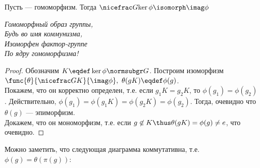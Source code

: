 \begin{theorem}\label{th:mainhom}
  Пусть  --- гомоморфизм. Тогда $\factorgr{G}{\ker\phi}\isomorph \imag\phi$
  \begin{samepage}
    \begin{flushright}
      {\small\itshape%
        Гомоморфный образ группы,\nopagebreak\\%
        Будь во имя коммунизма,\nopagebreak\\%
        Изоморфен фактор-группе\nopagebreak\\%
        По ядру гомоморфизма!}
    \end{flushright}
  \end{samepage}
\end{theorem}
\begin{proof}
  Обозначим $K\eqdef\ker\phi\normsubgr G$. Построим изоморфизм $\func{\theta}{\factorgr{G}{K}}{\imag\phi},\ \theta(gK)\eqdef\phi(g)$.\\
  Покажем, что он корректно определен, т.\:е. если $g_1K=g_2K$, то $\phi(g_1)=\phi(g_2)$. Действительно, $\phi(g_1)=\phi(g_1K)=\phi(g_2K)=\phi(g_2)$. Тогда, очевидно что $\theta(g)$ --- эпиморфизм. \\
  Докажем, что он мономорфизм, т.\:е. если $g\not\in K\thus \theta(gK)=\phi(g)\not=e$, что очевидно.
\end{proof}
\begin{remark}
  Можно заметить, что следующая диаграмма коммутативна, т.\:е. $\phi(g)=\theta(\pi(g))$:
  \begin{center}
    \centering
  \end{center}
\end{remark}

